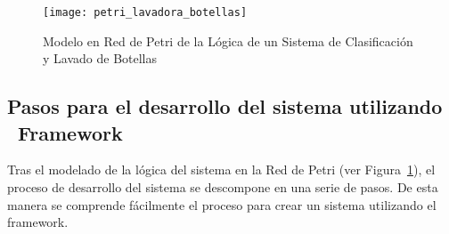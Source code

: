 \begin{figure}[H]
    \centering
    \texttt{[image: petri\_lavadora\_botellas]}
    \caption{Modelo en Red de Petri de la Lógica de un Sistema de Clasificación y
    Lavado de Botellas}
    \label{fig:petri_lavadora_botellas}
\end{figure}

\subsection {Pasos para el desarrollo del sistema utilizando  \\
\nombreFramework \  Framework}
\label{sec:pasos_desarrollo_lavadora_botellas}
Tras el modelado de la lógica del sistema en la Red de Petri (ver
Figura~\ref{fig:petri_lavadora_botellas}), el proceso de desarrollo del sistema
se descompone en una serie de pasos.
De esta manera se comprende fácilmente el proceso para crear un sistema
utilizando el framework.

